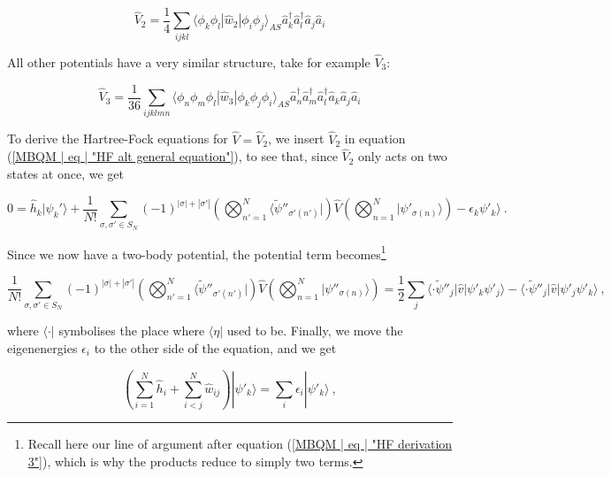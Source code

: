 \documentclass[10pt,twoside]{report}
\begin{document}
	\begin{equation}
		\hat{V}_2 = \frac{1}{4}\sum_{ijkl}\langle\phi_k\phi_l|\hat{w}_2|\phi_i\phi_j\rangle_{AS} \hat{a}_k^\dagger\hat{a}_l^\dagger\hat{a}_j\hat{a}_i
	\end{equation}
	
	All other potentials have a very similar structure, take for example $\hat{V}_3$:
	
	\begin{equation}
		\hat{V}_3 = \frac{1}{36}\sum_{ijklmn}\langle\phi_n\phi_m\phi_l|\hat{w}_3|\phi_k\phi_j\phi_i\rangle_{AS} \hat{a}_n^\dagger\hat{a}_m^\dagger\hat{a}_l^\dagger\hat{a}_k \hat{a}_j\hat{a}_i
	\end{equation}
	
	To derive the Hartree-Fock equations for $\hat{V} = \hat{V}_2$, we insert $\hat{V}_2$ in equation (\ref{MBQM | eq | "HF alt general equation"}), to see that, since $\hat{V}_2$ only acts on two states at once, we get
	
	\begin{equation}
		0 = \hat{h}_k|\psi_k'\rangle + \frac{1}{N!}\sum_{\sigma,\sigma'\in S_N} (-1)^{|\sigma|+|\sigma'|}\left(\bigotimes_{n'=1}^N \langle\widetilde{\psi}''_{\sigma'(n')}|\right)\hat{V}\left(\bigotimes_{n=1}^N |\psi'_{\sigma(n)}\rangle\right)
		- \epsilon_k\psi'_k\rangle \:.
	\end{equation}
	
	Since we now have a two-body potential, the potential term becomes\footnote{Recall here our line of argument after equation (\ref{MBQM | eq | "HF derivation 3"}), which is why the products reduce to simply two terms.}
	
	\begin{equation}
		\frac{1}{N!}\sum_{\sigma,\sigma'\in S_N} (-1)^{|\sigma|+|\sigma'|}\left(\bigotimes_{n'=1}^N \langle\widetilde{\psi}''_{\sigma'(n')}|\right)\hat{V}\left(\bigotimes_{n=1}^N |\psi''_{\sigma(n)}\rangle\right) = \frac{1}{2}\sum_{j} \langle \cdot \widetilde{\psi}''_j|\hat{v}|\psi'_k\psi'_j\rangle - \langle \cdot \widetilde{\psi}''_j|\hat{v}|\psi'_j\psi'_k\rangle\:,
	\end{equation}
	
	\noindent where $\langle\cdot|$ symbolises the place where $\langle\eta|$ used to be. Finally, we move the eigenenergies $\epsilon_i$ to the other side of the equation, and we get
	
	\begin{equation}
		\left(\sum_{i=1}^N \hat{h}_i + \sum_{i<j}^N \hat{w}_{ij}\right)|\psi'_k\rangle = \sum_i \epsilon_i|\psi'_k\rangle\:,
		\label{MBQM | eq | "HF derivation two body"}
	\end{equation}
	
\end{document}
